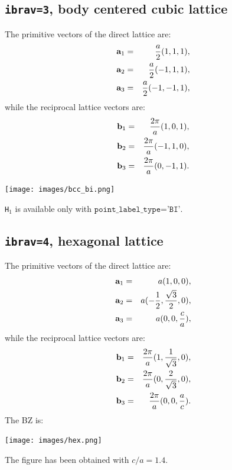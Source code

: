 \documentclass[12pt,a4paper]{article}
\begin{document}
\subsection{\texttt{ibrav=3}, body centered cubic lattice}

The primitive vectors of the direct lattice are:
\begin{eqnarray}
{\bf a}_1 &=&{a \over 2} (1, 1, 1), \nonumber \\
{\bf a}_2 &=&{a \over 2} (-1, 1, 1), \nonumber \\
{\bf a}_3 &=&{a \over 2} (-1, -1, 1), \nonumber
\nonumber
\end{eqnarray}
while the reciprocal lattice vectors are:
\begin{eqnarray}
{\bf b}_1 &=&{2\pi \over a} (1, 0, 1), \nonumber \\
{\bf b}_2 &=&{2\pi \over a} (-1, 1, 0), \nonumber \\
{\bf b}_3 &=&{2\pi \over a} (0, -1, 1). \nonumber
\nonumber
\end{eqnarray}
\begin{center}
\texttt{[image: images/bcc\_bi.png]}
\end{center}
\texttt{H$_1$} is available only with $\texttt{point\_label\_type='BI'}$.

\subsection{\texttt{ibrav=4}, hexagonal lattice}

The primitive vectors of the direct lattice are:
\begin{eqnarray}
{\bf a}_1 &=& a (1, 0, 0), \nonumber \\
{\bf a}_2 &=& a (-{1 \over 2}, {\sqrt{3} \over 2}, 0), \nonumber \\
{\bf a}_3 &=& a (0, 0, {c\over a}), \nonumber
\nonumber
\end{eqnarray}
while the reciprocal lattice vectors are:
\begin{eqnarray}
{\bf b}_1 &=& {2\pi \over a} (1, {1 \over \sqrt{3}}, 0), \nonumber \\
{\bf b}_2 &=& {2\pi \over a} (0, {2 \over \sqrt{3}}, 0), \nonumber \\
{\bf b}_3 &=& {2\pi \over a} (0, 0, {a\over c}). \nonumber
\nonumber
\end{eqnarray}
The BZ is:
\begin{center}
\texttt{[image: images/hex.png]}
\end{center}
The figure has been obtained with ${c/a}=1.4$.
\end{document}
